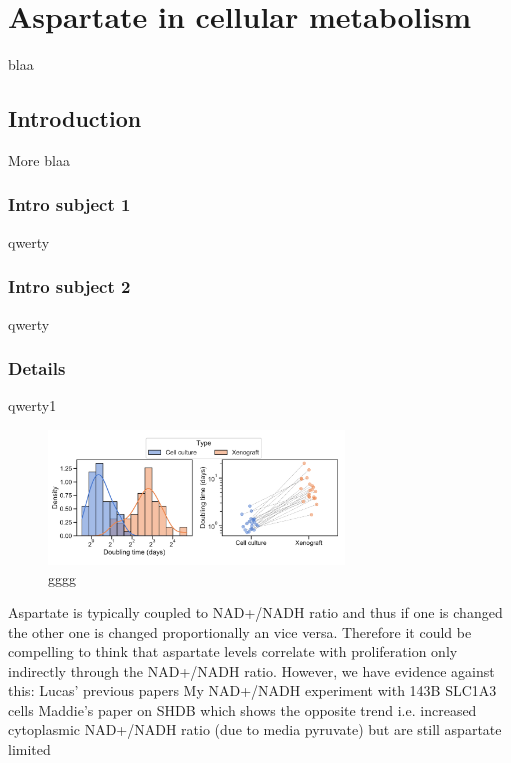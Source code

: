 \chapter{Aspartate in cellular metabolism}
blaa

\section{Introduction}
More blaa

\subsection{Intro subject 1}
qwerty

\subsection{Intro subject 2}
qwerty
\subsection{Details}
qwerty1


\begin{figure}
    \centering
    \includegraphics[width=0.70\textwidth]{figures/chap1/prlfr_contr.pdf}
    \caption[gggg]{
    gggg
    }
    \label{fig:ch1:prlfr_contr}
\end{figure}










Aspartate is typically coupled to NAD+/NADH ratio and thus if one is changed the other one is changed proportionally an vice versa.
Therefore it could be compelling to think that aspartate levels correlate with proliferation only indirectly through the NAD+/NADH ratio.
However, we have evidence against this:
Lucas' previous papers
My NAD+/NADH experiment with 143B SLC1A3 cells
Maddie's paper on SHDB which shows the opposite trend i.e. increased cytoplasmic NAD+/NADH ratio (due to media pyruvate) but are still aspartate limited



